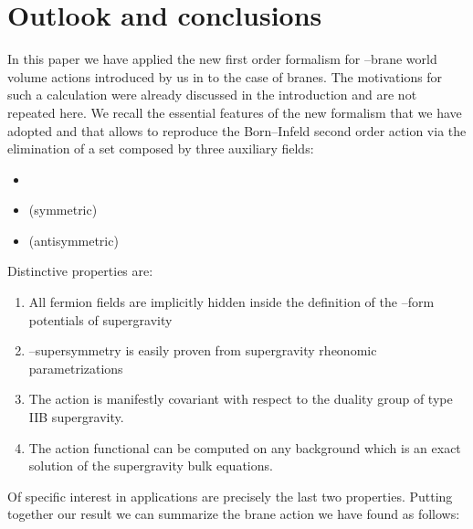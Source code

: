 \documentclass[a4paper,11pt]{article}
\begin{document}
\section{Outlook and conclusions}
\label{outlook}
In this paper we have applied the new first order formalism for
\coordHE{}--brane world volume actions introduced by us in \cite{noidued3} to the case of
\coordHE{} branes. The motivations for such a calculation were already discussed in the introduction and
are not repeated here. We recall the essential features of the new formalism  that
we have adopted and that allows to reproduce the
Born--Infeld second order action via the elimination of a set composed by three auxiliary fields:
\begin{itemize}
  \item {}\coordHE{}
  \item {}\coordHE{} (symmetric)
  \item {}\coordHE{} (antisymmetric)
\end{itemize}
Distinctive properties are:
\begin{enumerate}
  \item All fermion fields are implicitly hidden inside
  the definition of the \coordHE{}--form potentials of supergravity
  \item \myHighlight{$\kappa$}\coordHE{}--supersymmetry is easily proven from supergravity
  rheonomic parametrizations
  \item The action is manifestly covariant with respect to the duality group
  \coordHE{} of type IIB supergravity.
  \item The action functional can be computed on any background which
  is an exact solution of the supergravity bulk equations.
\end{enumerate}
Of specific interest in applications are precisely the last two
properties. Putting together our result we can summarize the \coordHE{} brane action we have found as follows:
\end{document}
